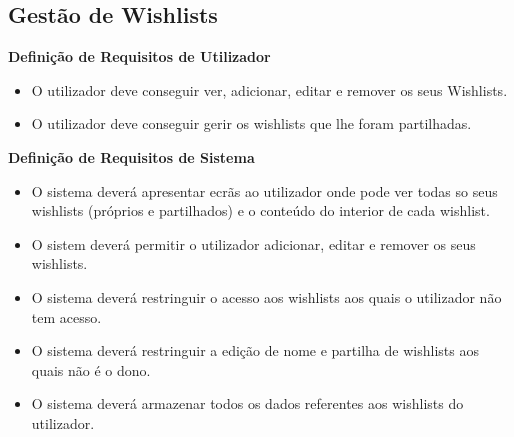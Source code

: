 \documentclass[a4paper]{report}
\begin{document}
        \subsection{Gestão de Wishlists}
            \textbf{Definição de Requisitos de Utilizador}
            \begin{itemize}
                \item O utilizador deve conseguir ver, adicionar, 
                editar e remover os seus Wishlists.
                \item O utilizador deve conseguir gerir os wishlists que 
                lhe foram partilhadas.
            \end{itemize}
            \textbf{Definição de Requisitos de Sistema}
            \begin{itemize}
                \item O sistema deverá apresentar ecrãs ao utilizador onde
                pode ver todas so seus wishlists (próprios e partilhados) e
                o conteúdo do interior de cada wishlist.
                \item O sistem deverá permitir o utilizador adicionar, editar e 
                remover os seus wishlists.
                \item O sistema deverá restringuir o acesso aos wishlists aos
                quais o utilizador não tem acesso.
                \item O sistema deverá restringuir a edição de nome e partilha
                de wishlists aos quais não é o dono.
                \item O sistema deverá armazenar todos os dados referentes aos
                wishlists do utilizador.
            \end{itemize}
\end{document}
